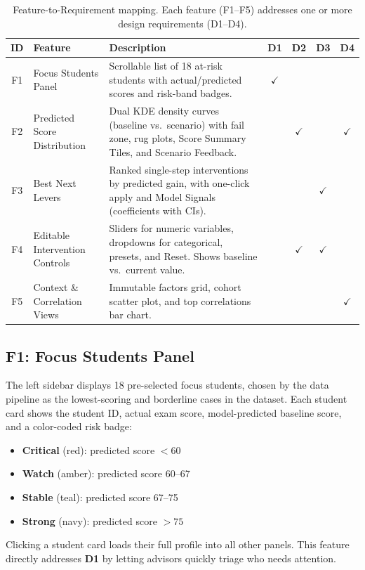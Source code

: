 \documentclass[11pt]{article}
\begin{document}
\begin{table}[t]
\centering
\small
\renewcommand{\arraystretch}{1.3}
\begin{tabular}{c p{4cm} p{6cm} c c c c}
\toprule
\textbf{ID} & \textbf{Feature} & \textbf{Description} & \textbf{D1} & \textbf{D2} & \textbf{D3} & \textbf{D4} \\
\midrule
F1 & Focus Students Panel & Scrollable list of 18 at-risk students with actual/predicted scores and risk-band badges. & $\checkmark$ & & & \\
F2 & Predicted Score Distribution & Dual KDE density curves (baseline vs.\ scenario) with fail zone, rug plots, Score Summary Tiles, and Scenario Feedback. & & $\checkmark$ & & $\checkmark$ \\
F3 & Best Next Levers & Ranked single-step interventions by predicted gain, with one-click apply and Model Signals (coefficients with CIs). & & & $\checkmark$ & \\
F4 & Editable Intervention Controls & Sliders for numeric variables, dropdowns for categorical, presets, and Reset. Shows baseline vs.\ current value. & & $\checkmark$ & $\checkmark$ & \\
F5 & Context \& Correlation Views & Immutable factors grid, cohort scatter plot, and top correlations bar chart. & & & & $\checkmark$ \\
\bottomrule
\end{tabular}
\caption{Feature-to-Requirement mapping. Each feature (F1--F5) addresses one or more design requirements (D1--D4).}
\label{tab:feature-mapping}
\end{table}

\subsection{F1: Focus Students Panel}

The left sidebar displays 18 pre-selected focus students, chosen by the data pipeline as the lowest-scoring and borderline cases in the dataset. Each student card shows the student ID, actual exam score, model-predicted baseline score, and a color-coded risk badge:
\begin{itemize}
  \item \textbf{Critical} (red): predicted score $< 60$
  \item \textbf{Watch} (amber): predicted score 60--67
  \item \textbf{Stable} (teal): predicted score 67--75
  \item \textbf{Strong} (navy): predicted score $> 75$
\end{itemize}
Clicking a student card loads their full profile into all other panels. This feature directly addresses \textbf{D1} by letting advisors quickly triage who needs attention.
\end{document}
